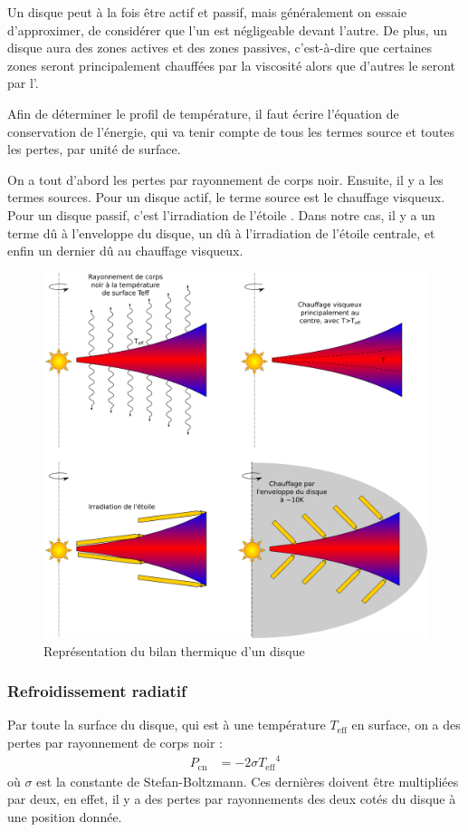 Un disque peut à la fois être actif et passif, mais généralement on essaie d'approximer, de considérer que l'un est négligeable devant l'autre. De plus, un disque aura des zones actives et des zones passives, c'est-à-dire que certaines zones seront principalement chauffées par la viscosité alors que d'autres le seront par l'.

\bigskip

Afin de déterminer le profil de température, il faut écrire l'équation de conservation de l'énergie, qui va tenir compte de tous les termes source et toutes les pertes, par unité de surface.

On a tout d'abord les pertes par rayonnement de corps noir. Ensuite, il y a les termes sources. Pour un disque actif, le terme source est le chauffage visqueux. Pour un disque passif, c'est l'irradiation de l'étoile \citep{chiang1997spectral}. Dans notre cas, il y a un terme dû à l'enveloppe du disque, un dû à l'irradiation de l'étoile centrale, et enfin un dernier dû au chauffage visqueux.


\begin{figure}[htbp]
\centering
\includegraphics[width=0.65\linewidth]{figure/disk_energy.pdf}
\caption[Bilan énergétique d'un disque.]{Représentation du bilan thermique d'un disque}\label{fig:energy_equilibrium}
\end{figure}

\subsubsection{Refroidissement radiatif}
Par toute la surface du disque, qui est à une température $T_\text{eff}$ en surface, on a des pertes par rayonnement de corps noir : 
\begin{align}
P_\text{cn} &= - 2\sigma {T_\text{eff}}^4
\end{align}
où $\sigma$ est la constante de Stefan-Boltzmann. Ces dernières doivent être multipliées par deux, en effet, il y a des pertes
par rayonnements des deux cotés du disque à une position donnée. 

